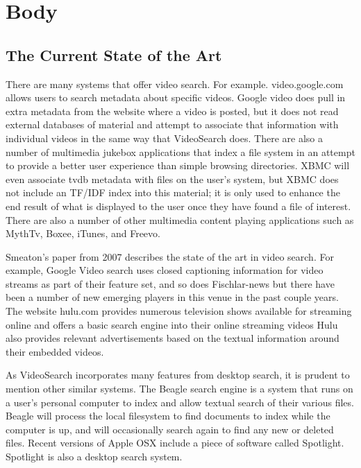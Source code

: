 \documentclass{acm_proc_article-sp}
\begin{document}
\section{Body}
\subsection{The Current State of the Art}

    There are many systems that offer video search.  For example. video.google.com allows users to search metadata about specific videos.  Google video does pull in extra metadata from the website where a video is posted, but it does not read external databases of material and attempt to associate that information with individual videos in the same way that VideoSearch does.  There are also a number of multimedia jukebox applications that index a file system in an attempt to provide a better user experience than simple browsing directories. XBMC will even associate tvdb metadata with files on the user’s system\cite{goodwin2010appliance}, but XBMC does not include an TF/IDF index into this material; it is only used to enhance the end result of what is displayed to the user once they have found a file of interest. There are also a number of other multimedia content playing applications such as MythTv, Boxee, iTunes, and Freevo.\cite{schopman2010notube}

    Smeaton’s paper from 2007 describes the state of the art in video search. \cite{smeaton2007techniques} For example, Google Video search uses closed captioning information for video streams as part of their feature set, and so does Fischlar-news \cite{lee2006user} but there have been a number of new emerging players in this venue in the past couple years.  The website hulu.com provides numerous television shows available for streaming online and offers a basic search engine into their online streaming videos \cite{patent:20100287474} Hulu also provides relevant advertisements based on the textual information around their embedded videos.

    As VideoSearch incorporates many features from desktop search, it is prudent to mention other similar systems.  The Beagle search engine is a system that runs on a user\textquoteright s personal computer to index and allow textual search of their various files.  \cite{brunkhorst2006beagle++}  Beagle will process the local filesystem to find documents to index while the computer is up, and will occasionally search again to find any new or deleted files.  Recent versions of Apple OSX include a piece of software called Spotlight.\cite{applex} Spotlight is also a desktop search system.
\end{document}
